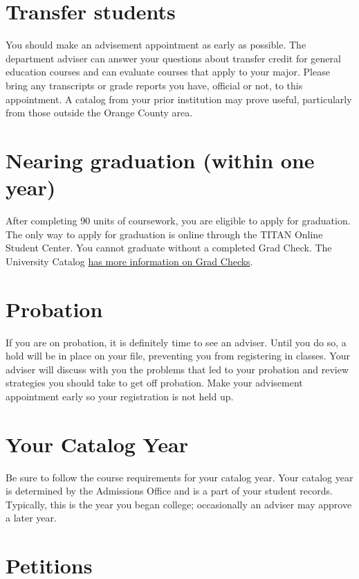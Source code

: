 \documentclass{book}
\begin{document}
\section{Transfer students}
You should make an advisement appointment as early as possible. The department adviser can answer your questions about transfer credit for general education courses and can evaluate courses that apply to your major. Please bring any transcripts or grade reports you have, official or not, to this appointment. A catalog from your prior institution may prove useful, particularly from those outside the Orange County area.

\section{Nearing graduation (within one year)}
After completing 90 units of coursework, you are eligible to apply for graduation. The only way to apply for graduation is online through the TITAN Online Student Center. You cannot graduate without a completed Grad Check.  The University Catalog \href{http://catalog.fullerton.edu/content.php?catoid=2&navoid=108#Graduation_Requirement_Check}{has more information on Grad Checks}.

\section{Probation}
If you are on probation, it is definitely time to see an adviser. Until you do so, a hold will be in place on your file, preventing you from registering in classes. Your adviser will discuss with you the problems that led to your probation and review strategies you should take to get off probation. Make your advisement appointment early so your registration is not held up.

\section{Your Catalog Year}
Be sure to follow the course requirements for your catalog year. Your catalog year is determined by the Admissions Office and is a part of your student records. Typically, this is the year you began college; occasionally an adviser may approve a later year.

\section{Petitions}
\label{section:petitions}
\end{document}
